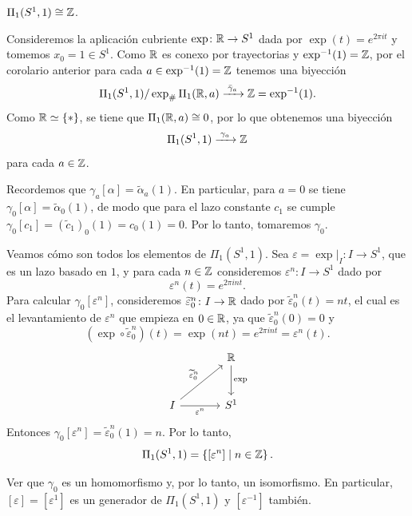 \begin{prop}
$\Pi_1(S^1, 1) \cong \mathbb{Z}$.
\end{prop}

\begin{dem}
Consideremos la aplicación cubriente $\exp \colon \mathbb{R} \to S^1$ dada por $\exp(t) = e^{2\pi i t}$ y tomemos $x_0 = 1 \in S^1$. Como $\mathbb{R}$ es conexo por trayectorias y $\exp^{-1}(1) = \mathbb{Z}$, por el corolario anterior para cada $a \in \exp^{-1}(1) = \mathbb{Z}$ tenemos una biyección
\[
\Pi_1(S^1, 1) / \exp_{\#}\Pi_1(\mathbb{R}, a) \xrightarrow{\;\bar{\gamma}_a\;} \mathbb{Z} = \exp^{-1}(1).
\]
Como $\mathbb{R} \simeq \{*\}$, se tiene que $\Pi_1(\mathbb{R}, a) \cong 0$, por lo que obtenemos una biyección
\[
\Pi_1(S^1, 1) \xrightarrow{\;\gamma_a\;} \mathbb{Z}
\]
para cada $a \in \mathbb{Z}$.

Recordemos que $\gamma_a[\alpha] = \widetilde{\alpha}_a(1)$. En particular, para $a = 0$ se tiene $\gamma_0[\alpha] = \widetilde{\alpha}_0(1)$, de modo que para el lazo constante $c_1$ se cumple $\gamma_0[c_1] = (\widetilde{c}_1)_0(1) = c_0(1) = 0$. Por lo tanto, tomaremos $\gamma_0$.

Veamos cómo son todos los elementos de $\Pi_1(S^1, 1)$. Sea $\varepsilon = \exp|_I \colon I \to S^1$, que es un lazo basado en $1$, y para cada $n \in \mathbb{Z}$ consideremos $\varepsilon^n \colon I \to S^1$ dado por
\[
\varepsilon^n(t) = e^{2\pi i n t}.
\]
Para calcular $\gamma_0[\varepsilon^n]$, consideremos $\widetilde{\varepsilon}_0^n \colon I \to \mathbb{R}$ dado por $\widetilde{\varepsilon}_0^n(t) = nt$, el cual es el levantamiento de $\varepsilon^n$ que empieza en $0 \in \mathbb{R}$, ya que $\widetilde{\varepsilon}_0^n(0) = 0$ y
\[
(\exp \circ \widetilde{\varepsilon}_0^n)(t) = \exp(nt) = e^{2\pi i n t} = \varepsilon^n(t).
\]
\[
\begin{tikzcd}[row sep=large, column sep=large]
 & \R \arrow[d, "\exp"] \\
I \arrow[ur, "\widetilde{\varepsilon}_0^n"] \arrow[r, "\varepsilon^n"'] & S^1
\end{tikzcd}
\]
Entonces $\gamma_0[\varepsilon^n] = \widetilde{\varepsilon}_0^n(1) = n$. Por lo tanto,
\[
\Pi_1(S^1, 1) = \left\{ [\varepsilon^n] \;\middle|\; n \in \mathbb{Z} \right\}.
\]
\end{dem}

\begin{ejercicio}
Ver que $\gamma_0$ es un homomorfismo y, por lo tanto, un isomorfismo. En particular, $[\varepsilon] = [\varepsilon^1]$ es un generador de $\Pi_1(S^1, 1)$ y $[\varepsilon^{-1}]$ también.
\end{ejercicio}

